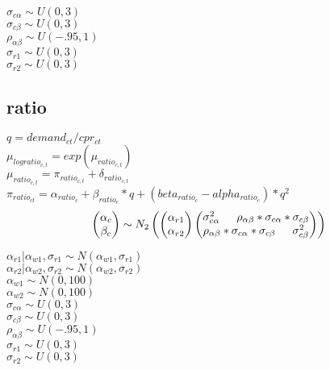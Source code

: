 \documentclass[12pt]{article}
\begin{document}
\noindent
 $\sigma_{c\alpha} \sim U(0,3) $ \\
 $\sigma_{c\beta} \sim U(0,3) $\\
 $\rho_{\alpha\beta} \sim U(-.95,1)$ \\
 $ \sigma_{r1} \sim U(0,3) $\\
 $ \sigma_{r2} \sim U(0,3) $\\
 
\subsection{ratio}
 $ q = demand_{ct}/cpr_{ct} $\\
 $ \mu_{logratio_{c,t}} = exp(\mu_{ratio_{c,t}})$\\
 $ \mu_{ratio_{c,t}}=  \pi_{ratio_{c,t}} + \delta_{ratio_{c,t}} $\\
 $ \pi_{ratio_{ct}} = \alpha_{ratio_c} + \beta_{ratio_c}*q + (beta_{ratio_c} - alpha_{ratio_c})*q^2$ \\
\begin{equation*}
  \begin{pmatrix}
  	\alpha_c \\
  	\beta_c 
  \end{pmatrix}
  \sim N_2
  \begin{pmatrix}
  	\begin{pmatrix}
    	\alpha_{r1} \\
    	\alpha_{r2}
  	\end{pmatrix}
  	\begin{pmatrix}
    	\sigma^2_{c\alpha}  $\indent$  \rho_{\alpha\beta}*\sigma_{c\alpha}*\sigma_{c\beta} \\
    	\rho_{\alpha\beta}*\sigma_{c\alpha}*\sigma_{c\beta} $\indent$ \sigma^2_{c\beta}
  	\end{pmatrix} 
  \end{pmatrix} \\
\end{equation*}

\noindent
 $ \alpha_{r1}|\alpha_{w1},\sigma_{r1} \sim N(\alpha_{w1},\sigma_{r1}) $ \\
 $ \alpha_{r2}|\alpha_{w2},\sigma_{r2} \sim N(\alpha_{w2},\sigma_{r2}) $ \\
 $ \alpha_{w1} \sim N(0,100) $ \\
 $ \alpha_{w2} \sim N(0,100) $ \\

\noindent
 $\sigma_{c\alpha} \sim U(0,3) $ \\
 $\sigma_{c\beta} \sim U(0,3) $\\
 $\rho_{\alpha\beta} \sim U(-.95,1)$ \\
 $ \sigma_{r1} \sim U(0,3) $\\
 $ \sigma_{r2} \sim U(0,3) $\\
 
\end{document}
